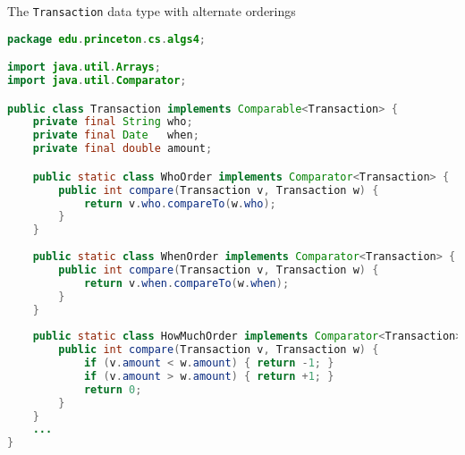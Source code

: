 \documentclass[8pt,a4paper,compress]{beamer}
\begin{document}
\begin{frame}[fragile]
The \lstinline{Transaction} data type with alternate orderings
\begin{lstlisting}[language=Java]
package edu.princeton.cs.algs4;

import java.util.Arrays;
import java.util.Comparator;

public class Transaction implements Comparable<Transaction> {  
    private final String who;
    private final Date   when; 
    private final double amount;

    public static class WhoOrder implements Comparator<Transaction> {
        public int compare(Transaction v, Transaction w) { 
            return v.who.compareTo(w.who); 
        }        
    }
    
    public static class WhenOrder implements Comparator<Transaction> {
        public int compare(Transaction v, Transaction w) { 
            return v.when.compareTo(w.when); 
        }
    }
    
    public static class HowMuchOrder implements Comparator<Transaction> {
        public int compare(Transaction v, Transaction w) {
            if (v.amount < w.amount) { return -1; }
            if (v.amount > w.amount) { return +1; }
            return 0;
        }
    }
    ...
}
\end{lstlisting}
\end{frame}
\end{document}
